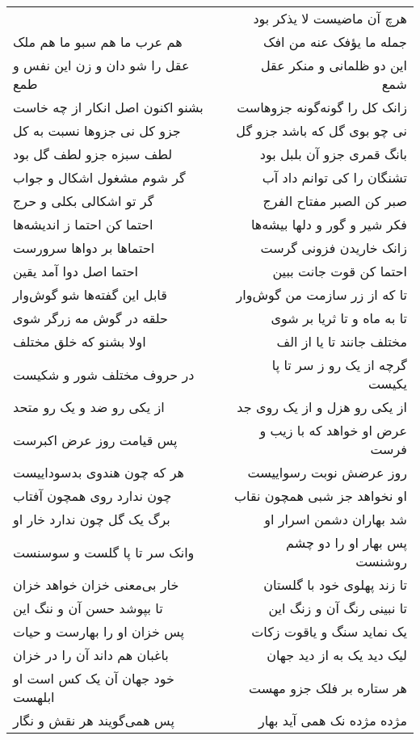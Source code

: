 \begin{center}
\begin{longtable}{l p{0.5cm} r}
&&
هرچ آن ماضیست لا یذکر بود
\\
هم عرب ما هم سبو ما هم ملک
&&
جمله ما یؤفک عنه من افک
\\
عقل را شو دان و زن این نفس و طمع
&&
این دو ظلمانی و منکر عقل شمع
\\
بشنو اکنون اصل انکار از چه خاست
&&
زانک کل را گونه‌گونه جزوهاست
\\
جزو کل نی جزوها نسبت به کل
&&
نی چو بوی گل که باشد جزو گل
\\
لطف سبزه جزو لطف گل بود
&&
بانگ قمری جزو آن بلبل بود
\\
گر شوم مشغول اشکال و جواب
&&
تشنگان را کی توانم داد آب
\\
گر تو اشکالی بکلی و حرج
&&
صبر کن الصبر مفتاح الفرج
\\
احتما کن احتما ز اندیشه‌ها
&&
فکر شیر و گور و دلها بیشه‌ها
\\
احتماها بر دواها سرورست
&&
زانک خاریدن فزونی گرست
\\
احتما اصل دوا آمد یقین
&&
احتما کن قوت جانت ببین
\\
قابل این گفته‌ها شو گوش‌وار
&&
تا که از زر سازمت من گوش‌وار
\\
حلقه در گوش مه زرگر شوی
&&
تا به ماه و تا ثریا بر شوی
\\
اولا بشنو که خلق مختلف
&&
مختلف جانند تا یا از الف
\\
در حروف مختلف شور و شکیست
&&
گرچه از یک رو ز سر تا پا یکیست
\\
از یکی رو ضد و یک رو متحد
&&
از یکی رو هزل و از یک روی جد
\\
پس قیامت روز عرض اکبرست
&&
عرض او خواهد که با زیب و فرست
\\
هر که چون هندوی بدسوداییست
&&
روز عرضش نوبت رسواییست
\\
چون ندارد روی همچون آفتاب
&&
او نخواهد جز شبی همچون نقاب
\\
برگ یک گل چون ندارد خار او
&&
شد بهاران دشمن اسرار او
\\
وانک سر تا پا گلست و سوسنست
&&
پس بهار او را دو چشم روشنست
\\
خار بی‌معنی خزان خواهد خزان
&&
تا زند پهلوی خود با گلستان
\\
تا بپوشد حسن آن و ننگ این
&&
تا نبینی رنگ آن و زنگ این
\\
پس خزان او را بهارست و حیات
&&
یک نماید سنگ و یاقوت زکات
\\
باغبان هم داند آن را در خزان
&&
لیک دید یک به از دید جهان
\\
خود جهان آن یک کس است او ابلهست
&&
هر ستاره بر فلک جزو مهست
\\
پس همی‌گویند هر نقش و نگار
&&
مژده مژده نک همی آید بهار

\end{longtable}
\end{center}
